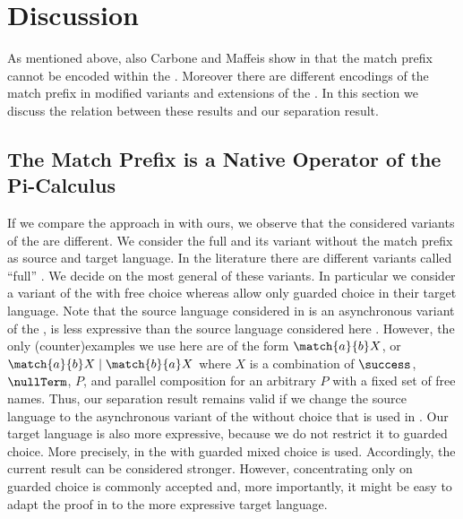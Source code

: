 \documentclass[final,copyright,creativecommons]{eptcs}
\begin{document}
\section{Discussion}
\label{sec:discussion}

As mentioned above, also Carbone and Maffeis show in \cite{carbone} that the match prefix cannot be encoded within the \piCal. Moreover there are different encodings of the match prefix in modified variants and extensions of the \piCal. In this section we discuss the relation between these results and our separation result.

\subsection{The Match Prefix is a Native Operator of the Pi-Calculus}
\label{sec:comparison}

If we compare the approach in \cite{carbone} with ours, we observe that the considered variants of the \piCal are different.
We consider the full \piCal and its variant without the match prefix as source and target language.
In the literature there are different variants called ``full'' \piCal. We decide on the most general of these variants. In particular we consider a variant of the \piCal with free choice whereas \cite{carbone} allow only guarded choice in their target language.
Note that the source language considered in \cite{carbone} is an asynchronous variant of the \piCal, \ie is less expressive than the source language considered here \cite{palamidessi03,petersNestmann14,petersNestmannGoltz13}.
However, the only (counter)examples we use here are of the form $ \match{a}{b}X $, or $\match{a}{b}X \mid \match{b}{a}X$ where $ X $ is a combination of $ \success $, $ \nullTerm $, $ P $, and parallel composition for an arbitrary $ P $ with a fixed set of free names. Thus, our separation result remains valid if we change the source language to the asynchronous variant of the \piCal without choice that is used in \cite{carbone}.
Our target language is also more expressive, because we do not restrict it to guarded choice. More precisely, in \cite{carbone} the \piCal with guarded mixed choice is used. Accordingly, the current result can be considered stronger. However, concentrating only on guarded choice is commonly accepted and, more importantly, it might be easy to adapt the proof in \cite{carbone} to the more expressive target language.
\end{document}
